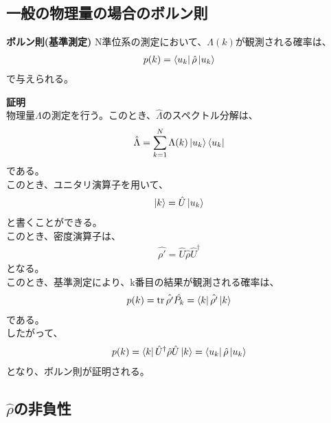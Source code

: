 \documentclass[a4paper,11pt]{jsarticle}
\begin{document}
\subsection{一般の物理量の場合のボルン則}
\begin{itembox}[l]{\textbf{ボルン則(基準測定)}}
    N準位系の測定において、$\Lambda(k)$が観測される確率は、
    \begin{align}
        p(k) = \bra{u_k}\hat{\rho}\ket{u_k}
    \end{align}
    で与えられる。
\end{itembox}
\textbf{証明}\\
物理量$\Lambda$の測定を行う。このとき、$\hat{\Lambda}$のスペクトル分解は、
\begin{align}
    \hat{\Lambda} = \sum_{k=1}^{N} \Lambda(k) \ket{u_k}\bra{u_k}
\end{align}
である。\\
このとき、ユニタリ演算子を用いて、
\begin{align}
    \ket{k} = \hat{U}\ket{u_k}
\end{align}
と書くことができる。\\
このとき、密度演算子は、
\begin{align}
    \hat{\rho'} = \hat{U}\hat{\rho}\hat{U}^\dagger
\end{align}
となる。\\
このとき、基準測定により、k番目の結果が観測される確率は、
\begin{align}
    p(k) = \trace{\hat{\rho'}\hat{P_k}}=\bra{k}\hat{\rho'}\ket{k}
\end{align}
である。\\
したがって、
\begin{align}
    p(k) = \bra{k}\hat{U}^\dagger\hat{\rho}\hat{U}\ket{k} = \bra{u_k}\hat{\rho}\ket{u_k}
\end{align}
となり、ボルン則が証明される。\\

\subsection{$\hat{\rho}$の非負性}
\end{document}
